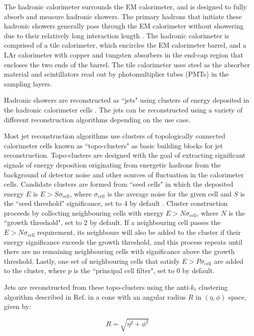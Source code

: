 The hadronic calorimeter surrounds the EM calorimeter, and is designed to fully absorb and measure hadronic showers. The primary hadrons that initiate these hadronic showers generally pass through the EM calorimeter without showering due to their relatively long interaction length \cite{atlas}. The hadronic calorimeter is comprised of a tile calorimeter, which encircles the EM calorimeter barrel, and a LAr calorimeter with copper and tungsten absorbers in the end-cap region that encloses the two ends of the barrel. The tile calorimeter uses steel as the absorber material and scintillators read out by photomultiplier tubes (PMTs) in the sampling layers. 

Hadronic showers are reconstructed as ``jets" using clusters of energy deposited in the hadronic calorimeter cells \cite{jet_reco}. The jets can be reconstructed using a variety of different reconstruction algorithms depending on the use case. 

Most jet reconstruction algorithms use clusters of topologically connected calorimeter cells known as ``topo-clusters" as basic building blocks for jet reconstruction. Topo-clusters are designed with the goal of extracting significant signals of energy deposition originating from energetic hadrons from the background of detector noise and other sources of fluctuation in the calorimeter cells. Candidate clusters are formed from ``seed cells" in which the deposited energy \(E\) is \(E>S\sigma_\text{cell}\), where \(\sigma_\text{cell}\) is the average noise for the given cell and \(S\) is the ``seed threshold" significance, set to 4 by default \cite{topo_cell_clustering}. Cluster construction proceeds by collecting neighbouring cells with energy \(E>N\sigma_\text{cell}\), where \(N\) is the ``growth threshold", set to 2 by default. If a neighbouring cell passes the \(E>N\sigma_\text{cell}\) requirement, its neighbours will also be added to the cluster if their energy significance exceeds the growth threshold, and this process repeats until there are no remaining neighbouring cells with significance above the growth threshold. Lastly, one set of neighbouring cells that satisfy \(E>P\sigma_\text{cell}\) are added to the cluster, where \(p\) is the ``principal cell filter", set to 0 by default.

Jets are reconstructed from these topo-clusters using the anti-\(k_t\) clustering algorithm described in Ref. \cite{akt_algo} in a cone with an angular radius \(R\) in \((\eta, \phi)\) space, given by:

\begin{equation}
\label{eq:jet_radius}
R = \sqrt{\eta^2 + \phi^2}
\end{equation}

